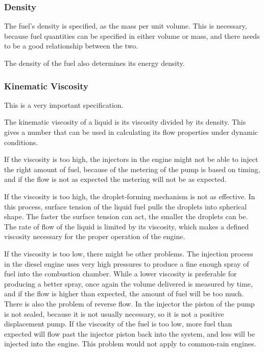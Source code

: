 \subsubsection{Density}

The fuel's density is specified, as the mass per unit volume. This is necessary, because fuel quantities can be specified in either volume or mass, and there needs to be a good relationship between the two. 

The density of the fuel also determines its energy density.

\subsubsection{Kinematic Viscosity}

This is a very important specification. 

The kinematic viscosity of a liquid is its viscosity divided by its density. This gives a number that can be used in calculating its flow properties under dynamic conditions.

If the viscosity is too high, the injectors in the engine might not be able to inject the right amount of fuel, because of the metering of the pump is based on timing, and if the flow is not as expected the metering will not be as expected.

If the viscosity is too high, the droplet-forming mechanism is not as effective. In this process, surface tension of the liquid fuel pulls the droplets into spherical shape. The faster the surface tension can act, the smaller the droplets can be. The rate of flow of the liquid is limited by its viscosity, which makes a defined viscosity necessary for the proper operation of the engine.

If the viscosity is too low, there might be other problems. The injection process in the diesel engine uses very high pressures to produce a fine enough spray of fuel into the combustion chamber. While a lower viscosity is preferable for producing a better spray, once again the volume delivered is measured by time, and if the flow is higher than expected, the amount of fuel will be too much. There is also the problem of reverse flow. In the injector the piston of the pump is not sealed, because it is not usually necessary, so it is not a positive displacement pump. If the viscosity of the fuel is too low, more fuel than expected will flow past the injector piston back into the system, and less will be injected into the engine. This problem would not apply to common-rain engines.

